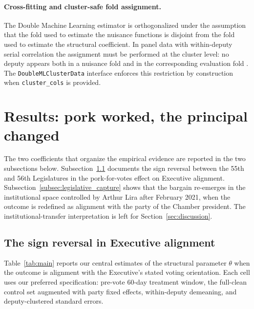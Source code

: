 \documentclass[pdflatex,sn-basic]{sn-jnl}
\begin{document}
\paragraph{Cross-fitting and cluster-safe fold assignment.} The Double Machine Learning estimator is orthogonalized under the assumption that the fold used to estimate the nuisance functions is disjoint from the fold used to estimate the structural coefficient. In panel data with within-deputy serial correlation the assignment must be performed at the cluster level: no deputy appears both in a nuisance fold and in the corresponding evaluation fold \citep{ChiangKatoMaSasaki2022}. The \texttt{DoubleMLClusterData} interface enforces this restriction by construction when \texttt{cluster\_cols} is provided.

\section{Results: pork worked, the principal changed}
\label{sec:results}

The two coefficients that organize the empirical evidence are reported in the two subsections below. Subsection~\ref{subsec:main_gov} documents the sign reversal between the 55th and 56th Legislatures in the pork-for-votes effect on Executive alignment. Subsection~\ref{subsec:legislative_capture} shows that the bargain re-emerges in the institutional space controlled by Arthur Lira after February 2021, when the outcome is redefined as alignment with the party of the Chamber president. The institutional-transfer interpretation is left for Section~\ref{sec:discussion}.

\subsection{The sign reversal in Executive alignment}
\label{subsec:main_gov}

Table~\ref{tab:main} reports our central estimates of the structural parameter $\theta$ when the outcome is alignment with the Executive's stated voting orientation. Each cell uses our preferred specification: pre-vote 60-day treatment window, the full-clean control set augmented with party fixed effects, within-deputy demeaning, and deputy-clustered standard errors.
\end{document}
